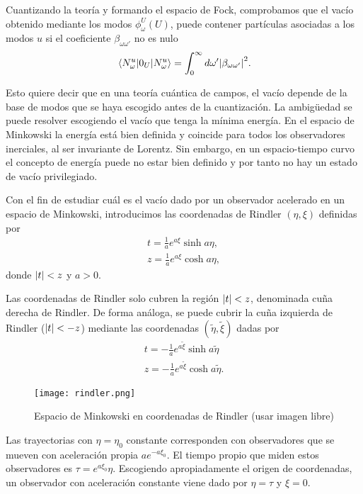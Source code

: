 Cuantizando la teoría y formando el espacio de Fock, comprobamos que el vacío obtenido mediante
los modos $\phi^U_\omega (U)$, puede contener partículas asociadas a los modos $u$
si el coeficiente $\beta_{\omega\omega'}$ no es nulo
\begin{equation}
  \ev{0_U}{N_\omega^u}=\int_0^\infty d\omega' \abs{\beta_{\omega\omega'}}^2.
\end{equation}

Esto quiere decir que en una teoría cuántica de campos, el vacío depende de la base de modos
que se haya escogido antes de la cuantización.
La ambigüedad se puede resolver escogiendo el vacío que tenga la mínima energía.
En el espacio de Minkowski la energía está bien definida y coincide para todos los observadores
inerciales, al ser invariante de Lorentz.
Sin embargo, en un espacio-tiempo curvo el concepto de energía puede no estar bien definido
y por tanto no hay un estado de vacío privilegiado.

Con el fin de estudiar cuál es el vacío dado por un observador acelerado en un espacio de 
Minkowski, introducimos las coordenadas de Rindler $(\eta,\xi)$ definidas por
\begin{gather}
  t=\frac{1}{a} e^{a\xi} \sinh a\eta ,\\
  z=\frac{1}{a}e^{a\xi} \cosh a\eta,
  \label{eq:rindler}
\end{gather}
donde $\abs{t}<z$ y $a>0$.

Las coordenadas de Rindler solo cubren la región $\abs{t}<z$, denominada cuña derecha de Rindler.
De forma análoga, se puede cubrir la cuña izquierda de Rindler ($\abs{t}<-z$) mediante
las coordenadas $(\tilde \eta, \tilde \xi)$ dadas por
\begin{gather}
  t=-\frac{1}{a} e^{a\tilde \xi} \sinh a\tilde \eta \\
  z=-\frac{1}{a} e^{a\tilde \xi} \cosh a\tilde \eta.
\end{gather}

\begin{figure}[htb]
\texttt{[image: rindler.png]}\hfill
 \caption{Espacio de Minkowski en coordenadas de Rindler (usar imagen libre)
}                   
  \label{fig:rindler}
\end{figure}

Las trayectorias con $\eta=\eta_0$ constante corresponden con observadores que se mueven con
aceleración propia $ae^{-a\xi_0}$.
El tiempo propio que miden estos observadores es $\tau = e^{a\xi_0}\eta$.
Escogiendo apropiadamente el origen de coordenadas, un observador con aceleración constante
viene dado por $\eta=\tau$ y $\xi=0$.


